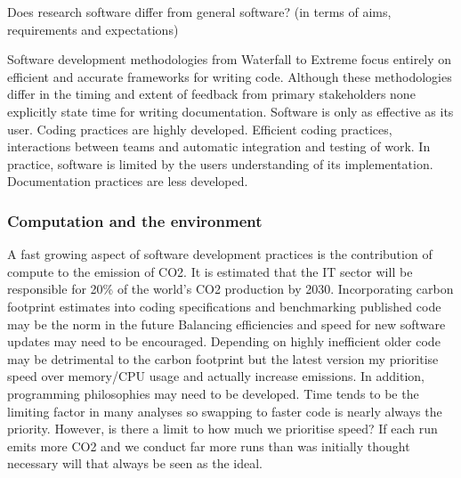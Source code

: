 \documentclass{SBCbookchapter}
\begin{document}
Does research software differ from general software? (in terms of aims, requirements and expectations)

Software development methodologies from Waterfall to Extreme focus entirely on efficient and accurate frameworks for writing code. 
Although these methodologies differ in the timing and extent of feedback from primary stakeholders none explicitly state time for writing documentation. 
Software is only as effective as its user.
Coding practices are highly developed. Efficient coding practices, interactions between teams and automatic integration and testing of work. In practice, software is limited by the users understanding of its implementation.
Documentation practices are less developed.





\subsubsection{Computation and the environment}

A fast growing aspect of software development practices is the contribution of compute to the emission of CO2.
It is estimated that the IT sector will be responsible for 20\% of the world's CO2 production by 2030. 
Incorporating carbon footprint estimates into coding specifications and benchmarking published code may be the norm in the future
Balancing efficiencies and speed for new software updates may need to be encouraged.
Depending on highly inefficient older code may be detrimental to the carbon footprint but the latest version my prioritise speed over memory/CPU usage and actually increase emissions.
In addition, programming philosophies may need to be developed. 
Time tends to be the limiting factor in many analyses so swapping to faster code is nearly always the priority. 
However, is there a limit to how much we prioritise speed? 
If each run emits more CO2 and we conduct far more runs than was initially thought necessary will that always be seen as the ideal.
\end{document}
